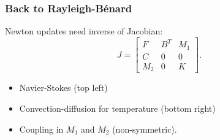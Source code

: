\documentclass[presentation]{beamer}
\begin{document}
\begin{frame}
  \frametitle{Back to Rayleigh-B\'enard}
  Newton updates need inverse of Jacobian:
  \begin{equation*}
    J = \begin{bmatrix}
      F   & B^T & M_1 \\
      C   & 0   & 0   \\
      M_2 & 0   & K
    \end{bmatrix}.
  \end{equation*}
  \begin{itemize}
  \item Navier-Stokes (top left)
  \item Convection-diffusion for temperature (bottom right)
  \item Coupling in $M_1$ and $M_2$ (non-symmetric).
  \end{itemize}
\end{frame}
\end{document}
